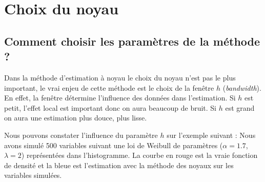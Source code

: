 \documentclass[
]{book}
\begin{document}
\hypertarget{choix-du-noyau}{%
\section{Choix du noyau}\label{choix-du-noyau}}

\hypertarget{comment-choisir-les-paramuxe8tres-de-la-muxe9thode}{%
\subsection{Comment choisir les paramètres de la méthode ?}\label{comment-choisir-les-paramuxe8tres-de-la-muxe9thode}}

Dans la méthode d'estimation à noyau le choix du noyau n'est pas le plus important, le vrai enjeu de cette méthode est le choix de la fenêtre \(h\) (\emph{bandwidth}).
En effet, la fenêtre détermine l'influence des données dans l'estimation. Si \(h\) est petit, l'effet local est important donc on aura beaucoup de bruit. Si \(h\) est grand on aura une estimation plus douce, plus lisse.

Nous pouvons constater l'influence du paramètre \(h\) sur l'exemple suivant :
Nous avons simulé 500 variables suivant une loi de Weibull de paramètres (\(\alpha = 1.7\), \(\lambda=2\)) représentées dans l'histogramme. La courbe en rouge est la vraie fonction de densité et la bleue est l'estimation avec la méthode des noyaux sur les variables simulées.
\end{document}
